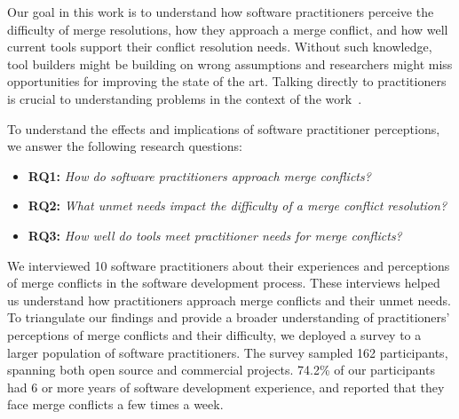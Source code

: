 Our goal in this work is to understand how software practitioners perceive the difficulty of merge resolutions, how they approach a merge conflict, and how well current tools support their conflict resolution needs. Without such knowledge, tool builders might be building on wrong assumptions and researchers might miss opportunities for improving the state of the art.
Talking directly to practitioners is crucial to understanding problems in the context of the work~\cite{fritz2010using, sillito2006questions, de2008answering, ko2007information}.

To understand the effects and implications of software practitioner perceptions, we answer the following research questions:

\begin{itemize}
\item \textbf{RQ1:} \textit{How do software practitioners approach merge conflicts?}
\item \textbf{RQ2:} \textit{What unmet needs impact the difficulty of a merge conflict resolution?}
\item \textbf{RQ3:} \textit{How well do tools meet practitioner needs for merge conflicts?}
\end{itemize}

We interviewed 10 software practitioners about their experiences and perceptions of merge conflicts in the software development process. These interviews helped us understand how practitioners approach merge conflicts and their unmet needs.
To triangulate our findings and provide a broader understanding of practitioners' perceptions of merge conflicts and their difficulty, we deployed a survey to a larger population of software practitioners.
The survey sampled 162 participants, spanning both open source and commercial projects. 74.2\% of our participants had 6 or more years of software development experience, and reported that they face merge conflicts a few times a week.

